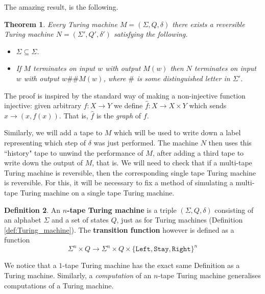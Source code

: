 \documentclass[12pt]{article}
\theoremstyle{plain}
\newtheorem{thm}{Theorem}[subsection] %
\theoremstyle{definition}
\newtheorem{defn}[thm]{Definition} %
\newcommand{\lto}{\longrightarrow}
\begin{document}
	The amazing result, is the following.
	\begin{thm}\label{thm:reversible}
		Every Turing machine $M = (\Sigma, Q, \delta)$ there exists a reversible Turing machine $N = (\Sigma', Q', \delta')$ satisfying the following.
		\begin{itemize}
			\item $\Sigma \subseteq \Sigma$.
			\item If $M$ terminates on input $w$ with output $M(w)$ then $N$ terminates on input $w$ with output $w \# \# M(w)$, where $\#$ is some distinguished letter in $\Sigma'$.
			\end{itemize}
		\end{thm}
	The proof is inspired by the standard way of making a non-injective function injective: given arbitrary $f: X \lto Y$ we define $\hat{f}: X \lto X \times Y$ which sends $x \lto (x,f(x))$. That is, $\hat{f}$ is the \emph{graph} of $f$.
	
	Similarly, we will add a tape to $M$ which will be used to write down a label representing which step of $\delta$ was just performed. The machine $N$ then uses this ``history" tape to unwind the performance of $M$, after adding a third tape to write down the output of $M$, that is. We will need to check that if a multi-tape Turing machine is reversible, then the corresponding single tape Turing machine is reversible. For this, it will be necessary to fix a method of simulating a multi-tape Turing machine on a single tape Turing machine.
	
	\begin{defn}
		An \textbf{$n$-tape Turing machine} is a triple $(\Sigma, Q, \delta)$ consisting of an alphabet $\Sigma$ and a set of states $Q$, just as for Turing machines (Definition \ref{def:Turing_machine}). The \textbf{transition function} however is defined as a function
		\begin{equation}
			\Sigma^n \times Q \lto \Sigma^n \times Q \times \{\texttt{Left}, \texttt{Stay}, \texttt{Right}\}^n
			\end{equation}
		\end{defn}
	
	We notice that a $1$-tape Turing machine has the exact same Definition as a Turing machine. Similarly, a \emph{computation} of an $n$-tape Turing machine generalises computations of a Turing machine.
	
\end{document}

